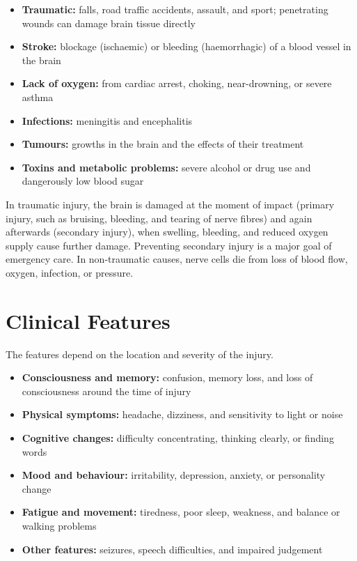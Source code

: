 \begin{itemize}
    \item \textbf{Traumatic:} falls, road traffic accidents, assault, and sport; penetrating wounds can damage brain tissue directly
    \item \textbf{Stroke:} blockage (ischaemic) or bleeding (haemorrhagic) of a blood vessel in the brain
    \item \textbf{Lack of oxygen:} from cardiac arrest, choking, near-drowning, or severe asthma
    \item \textbf{Infections:} meningitis and encephalitis
    \item \textbf{Tumours:} growths in the brain and the effects of their treatment
    \item \textbf{Toxins and metabolic problems:} severe alcohol or drug use and dangerously low blood sugar
\end{itemize}

In traumatic injury, the brain is damaged at the moment of impact (primary injury, such as bruising, bleeding, and tearing of nerve fibres) and again afterwards (secondary injury), when swelling, bleeding, and reduced oxygen supply cause further damage. Preventing secondary injury is a major goal of emergency care. In non-traumatic causes, nerve cells die from loss of blood flow, oxygen, infection, or pressure.

\section*{Clinical Features}
The features depend on the location and severity of the injury.

\begin{itemize}
    \item \textbf{Consciousness and memory:} confusion, memory loss, and loss of consciousness around the time of injury
    \item \textbf{Physical symptoms:} headache, dizziness, and sensitivity to light or noise
    \item \textbf{Cognitive changes:} difficulty concentrating, thinking clearly, or finding words
    \item \textbf{Mood and behaviour:} irritability, depression, anxiety, or personality change
    \item \textbf{Fatigue and movement:} tiredness, poor sleep, weakness, and balance or walking problems
    \item \textbf{Other features:} seizures, speech difficulties, and impaired judgement
\end{itemize}

